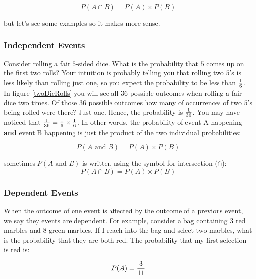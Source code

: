 \begin{equation}
  P(A \cap B) = P(A)  \times P(B)\nonumber
\end{equation}

but let's see some examples so it makes more sense.


\subsubsection*{Independent Events}
Consider rolling a fair $6$-sided dice.  What is the probability that
$5$ comes up on the first two rolls?  Your intuition is probably telling
you that rolling two $5$'s is less likely than rolling just one, so
you expect the probability to be less than ${1\over 6}$.  In figure
\ref{twoDieRolls} you will see all 36 possible outcomes when rolling a
fair dice two times.  Of those 36 possible outcomes how many of
occurrences of two $5$'s being rolled were there?  Just one.  Hence,
the probability is ${1\over 36}$.  You may have noticed that
${1\over 36} = {1\over 6} \times {1\over 6}$.  In other words, the
probability of event A happening \textbf{and} event B happening is
just the product of the two individual probabilities:

\begin{equation}\label{eq:andprobability}
  P(A\text{ and } B) = P(A) \times P(B)
\end{equation}



sometimes $P(A\text{ and } B)$ is written using the symbol for
intersection ($\cap$):
\begin{equation}\label{eq:andprobability}
  P(A \cap B) = P(A) \times P(B)
\end{equation}




\subsubsection{Dependent Events}
When the outcome of one event is affected by the outcome of a previous
event, we say they events are dependent.  For example, consider a bag
containing $3$ red marbles and $8$ green marbles.  If I reach into the
bag and select two marbles, what is the probability that they are both
red.  The probability that my first selection is red is:

\begin{equation}
P(A) = {3\over 11}  \nonumber
\end{equation}

